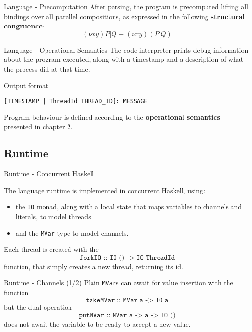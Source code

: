 \begin{frame}{Language - Precomputation}
    After parsing, the program is precomputed lifting all bindings over all parallel compositions, as expressed in the following \textbf{structural congruence}: 
    \[ (\nu x y) P | Q \equiv (\nu x y) (P | Q) \]
\end{frame}

\begin{frame}[fragile]{Language - Operational Semantics}
    The code interpreter prints debug information about the program executed, along with a timestamp and a description of what the process did at that time.

    \begin{block}{Output format}
        \begin{lstlisting}
[TIMESTAMP | ThreadId THREAD_ID]: MESSAGE
        \end{lstlisting}
    \end{block}

    Program behaviour is defined according to the \textbf{operational semantics} presented in chapter 2.
\end{frame}

\subsection{Runtime}

\begin{frame}{Runtime - Concurrent Haskell}

    The language runtime is implemented in concurrent Haskell, using:
    \begin{itemize}
        \item the \texttt{IO} monad, along with a local state that maps variables to channels and literals, to model threads;
        \item and the \texttt{MVar} type to model channels.
    \end{itemize}

    Each thread is created with the \[ \texttt{forkIO :: IO () -> IO ThreadId} \] function, that simply creates a new thread, returning its id. %
    
\end{frame}

\begin{frame}{Runtime - Channels (1/2)}
    Plain \texttt{MVar}s can await for value insertion with the function \[ \texttt{takeMVar :: MVar a -> IO a} \] but the dual operation \[ \texttt{putMVar :: MVar a -> a -> IO ()} \] does not await the variable to be ready to accept a new value.
\end{frame}


